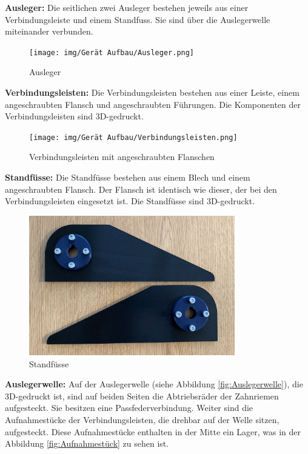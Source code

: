 \newpage

\textbf{Ausleger:} Die seitlichen zwei Ausleger bestehen jeweils aus einer Verbindungsleiste und einem Standfuss. Sie sind über die Auslegerwelle miteinander verbunden.

\begin{figure}[H]
  \texttt{[image: img/Gerät Aufbau/Ausleger.png]}
  \centering
  \caption{Ausleger}
  \label{fig:Ausleger}
\end{figure}

\textbf{Verbindungsleisten:} Die Verbindungsleisten bestehen aus einer Leiste, einem angeschraubten Flansch und angeschraubten Führungen. Die Komponenten der Verbindungsleisten sind 3D-gedruckt.

\begin{figure}[H]
  \texttt{[image: img/Gerät Aufbau/Verbindungsleisten.png]}
  \centering
  \caption{Verbindungsleisten mit angeschraubten Flanschen}
  \label{fig:Verbindungsleisten}
\end{figure}

\textbf{Standfüsse:} Die Standfüsse bestehen aus einem Blech und einem angeschraubten Flansch. Der Flansch ist identisch wie dieser, der bei den Verbindungsleisten eingesetzt ist. Die Standfüsse sind 3D-gedruckt.

\begin{figure}[H]
  \includegraphics[width=0.8\textwidth]{img/Gerät Aufbau/Standfüsse.png}
  \centering
  \caption{Standfüsse}
  \label{fig:Standfüsse}
\end{figure}

\newpage

\textbf{Auslegerwelle:} Auf der Auslegerwelle (siehe Abbildung \ref{fig:Auslegerwelle}), die 3D-gedruckt ist, sind auf beiden Seiten die Abtriebsräder der Zahnriemen aufgesteckt. Sie besitzen eine Passfederverbindung. Weiter sind die Aufnahmestücke der Verbindungsleisten, die drehbar auf der Welle sitzen, aufgesteckt. Diese Aufnahmestücke enthalten in der Mitte ein Lager, was in der Abbildung \ref{fig:Aufnahmestück} zu sehen ist.

